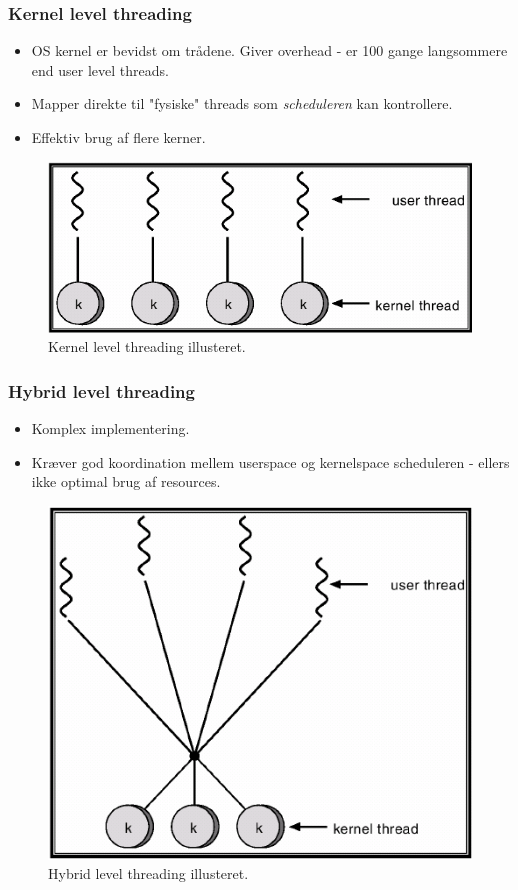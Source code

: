 \subsubsection{Kernel level threading}
\begin{itemize}
	\item OS kernel er bevidst om trådene. Giver overhead - er 100 gange langsommere end user level threads.
	\item Mapper direkte til "fysiske" threads som \textit{scheduleren} kan kontrollere.
	\item Effektiv brug af flere kerner.
\end{itemize}

\begin{figure}[H]
	\centering
	\includegraphics[width=0.5\linewidth]{figs/spm1/kernelthreads}
	\caption{Kernel level threading illusteret.}
	\label{fig:kernelthreads}
\end{figure}

\subsubsection{Hybrid level threading}
\begin{itemize}
	\item Komplex implementering.
	\item Kræver god koordination mellem userspace og kernelspace scheduleren - ellers ikke optimal brug af resources.
\end{itemize}

\begin{figure}[H]
	\centering
	\includegraphics[width=0.5\linewidth]{figs/spm1/hybridthreads}
	\caption{Hybrid level threading illusteret.}
	\label{fig:hybridthreads}
\end{figure}

